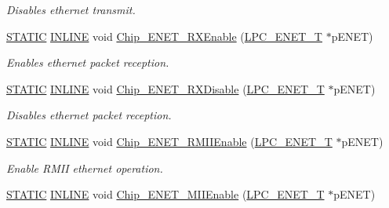 \begin{DoxyCompactItemize}
\begin{DoxyCompactList}\small\item\em Disables ethernet transmit. \end{DoxyCompactList}\item 
\hyperlink{group___l_p_c___types___public___macros_ga10b2d890d871e1489bb02b7e70d9bdfb}{S\+T\+A\+T\+IC} \hyperlink{spifi__18xx__43xx_8h_a2eb6f9e0395b47b8d5e3eeae4fe0c116}{I\+N\+L\+I\+NE} void \hyperlink{group___e_n_e_t__18_x_x__43_x_x_gaccc601f3393807fe6255771fb1c47a0b}{Chip\+\_\+\+E\+N\+E\+T\+\_\+\+R\+X\+Enable} (\hyperlink{struct_l_p_c___e_n_e_t___t}{L\+P\+C\+\_\+\+E\+N\+E\+T\+\_\+T} $\ast$p\+E\+N\+ET)
\begin{DoxyCompactList}\small\item\em Enables ethernet packet reception. \end{DoxyCompactList}\item 
\hyperlink{group___l_p_c___types___public___macros_ga10b2d890d871e1489bb02b7e70d9bdfb}{S\+T\+A\+T\+IC} \hyperlink{spifi__18xx__43xx_8h_a2eb6f9e0395b47b8d5e3eeae4fe0c116}{I\+N\+L\+I\+NE} void \hyperlink{group___e_n_e_t__18_x_x__43_x_x_gaef60a4790dcce43254081ea7fe5a22d4}{Chip\+\_\+\+E\+N\+E\+T\+\_\+\+R\+X\+Disable} (\hyperlink{struct_l_p_c___e_n_e_t___t}{L\+P\+C\+\_\+\+E\+N\+E\+T\+\_\+T} $\ast$p\+E\+N\+ET)
\begin{DoxyCompactList}\small\item\em Disables ethernet packet reception. \end{DoxyCompactList}\item 
\hyperlink{group___l_p_c___types___public___macros_ga10b2d890d871e1489bb02b7e70d9bdfb}{S\+T\+A\+T\+IC} \hyperlink{spifi__18xx__43xx_8h_a2eb6f9e0395b47b8d5e3eeae4fe0c116}{I\+N\+L\+I\+NE} void \hyperlink{group___e_n_e_t__18_x_x__43_x_x_ga779524b9b8e472f0ba1c3a703ca177fc}{Chip\+\_\+\+E\+N\+E\+T\+\_\+\+R\+M\+I\+I\+Enable} (\hyperlink{struct_l_p_c___e_n_e_t___t}{L\+P\+C\+\_\+\+E\+N\+E\+T\+\_\+T} $\ast$p\+E\+N\+ET)
\begin{DoxyCompactList}\small\item\em Enable R\+M\+II ethernet operation. \end{DoxyCompactList}\item 
\hyperlink{group___l_p_c___types___public___macros_ga10b2d890d871e1489bb02b7e70d9bdfb}{S\+T\+A\+T\+IC} \hyperlink{spifi__18xx__43xx_8h_a2eb6f9e0395b47b8d5e3eeae4fe0c116}{I\+N\+L\+I\+NE} void \hyperlink{group___e_n_e_t__18_x_x__43_x_x_gaed6cdc51afaeb89d7bb465bcfc7ddf2e}{Chip\+\_\+\+E\+N\+E\+T\+\_\+\+M\+I\+I\+Enable} (\hyperlink{struct_l_p_c___e_n_e_t___t}{L\+P\+C\+\_\+\+E\+N\+E\+T\+\_\+T} $\ast$p\+E\+N\+ET)

\end{DoxyCompactItemize}
